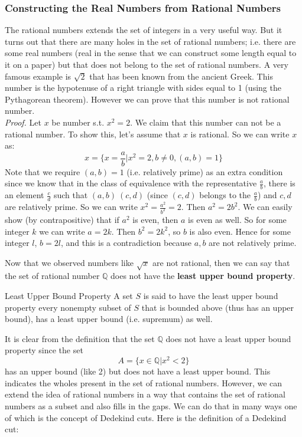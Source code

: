 \subsubsection{Constructing the Real Numbers from Rational Numbers}

The rational numbers extends the set of integers in a very useful way. But it turns out that there are many holes in the set of rational numbers; i.e. there are some real numbers (real in the sense that we can construct some length equal to it on a paper) but that does not belong to the set of rational numbers. A very famous example is $\sqrt{2}$ that has been known from the ancient Greek. This number is the hypotenuse of a right triangle with sides equal to 1 (using the Pythagorean theorem). However we can prove that this number is not rational number.  \\

\textit{Proof.} Let $x$ be number s.t. $x^2 = 2$. We claim that this number can not be a rational number. To show this, let's assume that $x$ is rational. So we can write $x$ as: 
\[ x = \{ x = \frac{a}{b} | x^2 = 2, b \neq 0,  (a,b) = 1 \}  \]
Note that we require $(a,b)=1$ (i.e. relatively prime) as an extra condition since we know that in the class of equivalence with the representative $\frac{a}{b}$, there is an element $\frac{c}{d}$ such that $(a,b) ~ (c,d) $ (since $(c,d)$ belongs to the $\frac{a}{b}$) and $c,d$ are relatively prime. So we can write $x^2 = \frac{a^2}{b^2} = 2$. Then $a^2 = 2 b^2$. We can easily show (by contrapositive) that if $a^2$ is even, then $a$ is even as well. So for some integer $k$ we can write $a = 2k$. Then $b^2 = 2 k^2$, so $b$ is also even. Hence for some integer $l$, $b = 2l$, and this is a contradiction because $a,b$ are not relatively prime.

Now that we observed numbers like $\sqrt{x}$ are not rational, then we can say that the set of rational number $\mathbb{Q}$ does not have the \textbf{least upper bound property}.

\begin{defbox}{Least Upper Bound Property}
	A set $S$ is said to have the least upper bound property every nonempty subset of $S$ that is bounded above (thus has an upper bound), has a least upper bound (i.e. supremum) as well. 
\end{defbox}

It is clear from the definition that the set $\mathbb{Q}$ does not have a least upper bound property since the set  \[A =\{ x \in \mathbb{Q} | x^2 < 2 \} \]has an upper bound (like 2) but does not have a least upper bound. This indicates the wholes present in the set of rational numbers. However, we can extend the idea of rational numbers in a way that contains the set of rational numbers as a subset and also fills in the gaps. We can do that in many ways one of which is the concept of Dedekind cuts. Here is the definition of a Dedekind cut:

